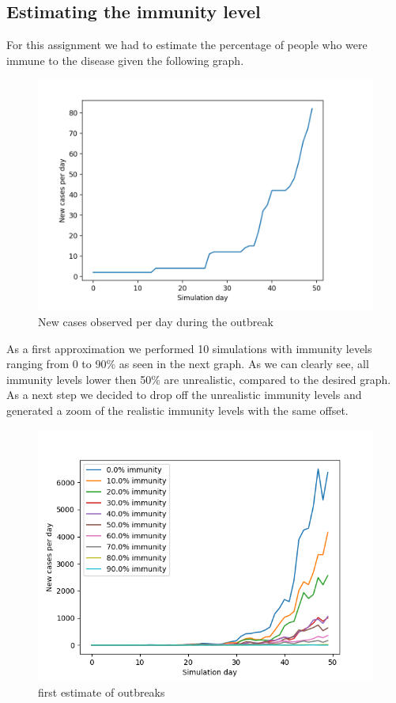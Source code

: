 \documentclass[runningheads]{llncs}
\begin{document}
	\subsection{Estimating the immunity level}
	For this assignment we had to estimate the percentage of people who were immune to the disease given the following graph.
	\\ 
	\begin{figure}[h!]
		\includegraphics[width=\textwidth]{original.png}
		\caption{New cases observed per day during the outbreak}
	\end{figure}
	\newpage
	As a first approximation we performed 10 simulations with immunity levels ranging from 0 to 90\% as seen in the next graph. As we can clearly see, all immunity levels lower then 50\% are unrealistic, compared to the desired graph. As a next step we decided to drop off the unrealistic immunity levels and generated a zoom of the realistic immunity levels with the same offset.
	\begin{figure}
		\includegraphics[width=\textwidth]{test_immunity_0-100.png}
		\caption{first estimate of outbreaks}
	\end{figure}
	\newpage
	
\end{document}
